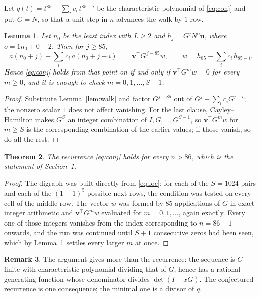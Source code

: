 \documentclass[11pt,a4paper]{article}
\theoremstyle{plain}
\newtheorem{theorem}{Theorem}
\newtheorem{lemma}[theorem]{Lemma}
\theoremstyle{definition}
\newtheorem{remark}[theorem]{Remark}
\begin{document}
Let $q(t)=t^{85}-\sum_i c_i\,t^{85-i}$ be the characteristic polynomial of
\eqref{eq:conj} and put $G=N$, so that a unit step in $n$ advances the walk by
$1$ row.

\begin{lemma}\label{lem:crit}
Let $n_0$ be the least index with $L\ge2$ and $h_j=G^{j}N^{o}\mathbf{u}$, where
$o=1n_0+0-2$. Then for $j\ge85$,
\[
a(n_0+j)-\sum_i c_i\,a(n_0+j-i)\;=\;\,\mathbf{v}^{\!\top}G^{\,j-85}w,
\qquad w=h_{85}-\sum_i c_i\,h_{85-i} .
\]
Hence \eqref{eq:conj} holds from that point on if and only if
$\mathbf{v}^{\!\top}G^{m}w=0$ for every $m\ge0$, and it is enough to check
$m=0,1,\dots,S-1$.
\end{lemma}

\begin{proof}
Substitute Lemma~\ref{lem:walk} and factor $G^{j-85}$ out of
$G^{j}-\sum_ic_iG^{j-i}$; the nonzero scalar $1$ does not affect
vanishing. For the last clause, Cayley--Hamilton makes $G^{S}$ an integer combination of
$I,G,\dots,G^{S-1}$, so $\mathbf{v}^{\!\top}G^{m}w$ for $m\ge S$ is the corresponding
combination of the earlier values; if those vanish, so do all the rest.
\end{proof}

\begin{theorem}
The recurrence \eqref{eq:conj} holds for every $n>86$, which is the statement of
Section~1.
\end{theorem}

\begin{proof}
The digraph was built directly from \eqref{eq:loc}: for each of the $S=1024$ pairs and each
of the $(1+1)^{5}$ possible next rows, the condition was tested on every cell of
the middle row. The vector $w$ was formed by $85$ applications of $G$ in exact integer
arithmetic and $\mathbf{v}^{\!\top}G^{m}w$ evaluated for $m=0,1,\dots$, again exactly.
Every one of those integers vanishes from the index corresponding to $n=86+1$ onwards,
and the run was continued until $S+1$ consecutive zeros had been seen, which by
Lemma~\ref{lem:crit} settles every larger $m$ at once.
\end{proof}

\begin{remark}
The argument gives more than the recurrence: the sequence is $C$-finite with characteristic
polynomial dividing that of $G$, hence has a rational generating function whose denominator
divides $\det(I-xG)$. The conjectured recurrence is one consequence; the minimal one is a
divisor of $q$.
\end{remark}
\end{document}
